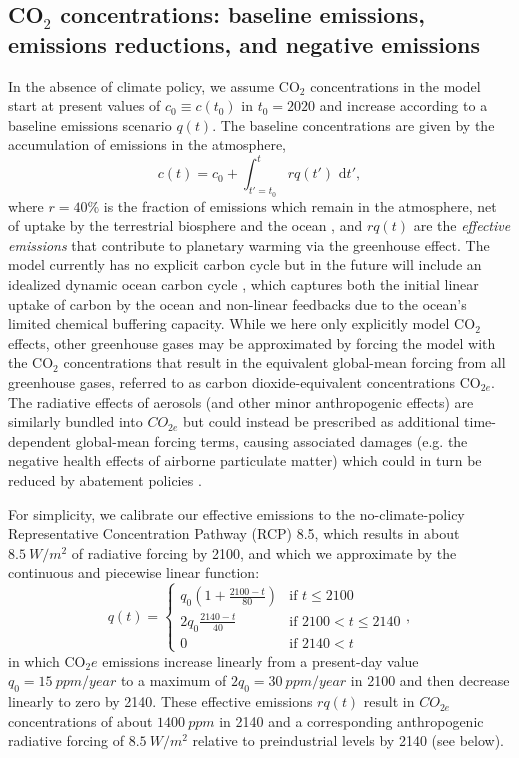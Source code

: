 \documentclass{article}
\begin{document}
\subsection{CO$_{2}$ concentrations: baseline emissions, emissions reductions, and negative emissions}

In the absence of climate policy, we assume CO$_{2}$ concentrations in the model start at present values of $c_{0} \equiv c(t_{0})$ in $t_{0}=2020$ and increase according to a baseline emissions scenario $q(t)$. The baseline concentrations are given by the accumulation of emissions in the atmosphere,
\begin{equation}
c(t) = c_{0} + \int_{t'=t_{0}}^{t} rq(t') \text{ d}t',
\end{equation}
where $r = 40\%$ is the fraction of emissions which remain in the atmosphere, net of uptake by the terrestrial biosphere and the ocean \citep{solomon_irreversible_2009}, and $rq(t)$ are the \textit{effective emissions} that contribute to planetary warming via the greenhouse effect. The model currently has no explicit carbon cycle but in the future will include an idealized dynamic ocean carbon cycle \citep{glotter_simple_2014}, which captures both the initial linear uptake of carbon by the ocean and non-linear feedbacks due to the ocean's limited chemical buffering capacity. While we here only explicitly model CO$_{2}$ effects, other greenhouse gases may be approximated by forcing the model with the CO$_{2}$ concentrations that result in the equivalent global-mean forcing from all greenhouse gases, referred to as carbon dioxide-equivalent concentrations CO$_{2e}$. The radiative effects of aerosols (and other minor anthropogenic effects) are similarly bundled into $CO_{2e}$ but could instead be prescribed as additional time-dependent global-mean forcing terms, causing associated damages (e.g. the negative health effects of airborne particulate matter) which could in turn be reduced by abatement policies \citep{thompson_systems_2014}.

For simplicity, we calibrate our effective emissions to the no-climate-policy Representative Concentration Pathway (RCP) 8.5, which results in about $\SI{8.5}{W/m^2}$ of radiative forcing by 2100, and which we approximate by the continuous and piecewise linear function:
\begin{equation}
    q(t) = 
    \begin{cases}
        q_{0}(1 + \frac{2100-t}{80}) &\mbox{if } t \le 2100 \\
        2q_{0}\frac{2140-t}{40} &\mbox{if } 2100 < t \le 2140 \\
        0 &\mbox{if } 2140 < t
    \end{cases},
\end{equation}
in which CO$_{2}e$ emissions increase linearly from a present-day value $q_{0} = \SI{15}{ppm/year}$ to a maximum of $2q_{0} = \SI{30}{ppm/year}$ in 2100 and then decrease linearly to zero by 2140. These effective emissions $rq(t)$ result in $CO_{2e}$ concentrations of about $\SI{1400}{ppm}$ in 2140 and a corresponding anthropogenic radiative forcing of $\SI{8.5}{W/m^2}$ relative to preindustrial levels by 2140 (see below).
\end{document}

